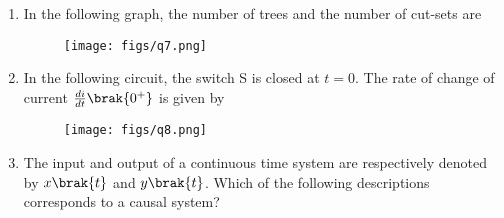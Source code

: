 \documentclass[a4paper, 11pt]{article}
\begin{document}
\begin{enumerate}
    \hfill{}
\newpage
    \item In the following graph, the number of trees  and the number of cut-sets  are
    \begin{figure}[H]
        \centering
        \texttt{[image: figs/q7.png]}
        \caption*{}
        \label{fig:q7}
    \end{figure}
    
    \begin{enumerate}
    \end{enumerate}

    \hfill{}

    \item In the following circuit, the switch S is closed at $t=0$. The rate of change of current $\frac{di}{dt}\brak{0^+}$ is given by
    \begin{figure}[H]
        \centering
        \texttt{[image: figs/q8.png]}
        \caption*{}
        \label{fig:q8}
    \end{figure}
    
    \begin{enumerate}
    \end{enumerate}
    
    \hfill{}

    \item The input and output of a continuous time system are respectively denoted by $x\brak{t}$ and $y\brak{t}$. Which of the following descriptions corresponds to a causal system?
    
    \begin{enumerate}
    \end{enumerate}
    

\end{enumerate}
\end{document}
